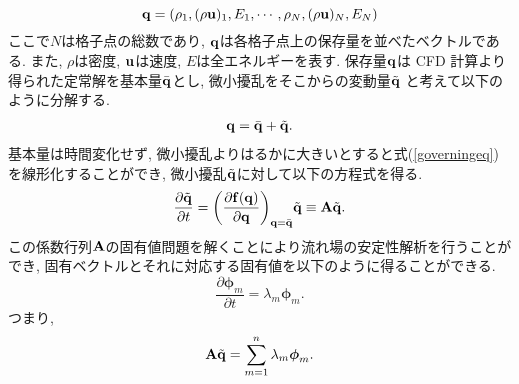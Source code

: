 \begin{equation}
  {\bf q}=(\rho_1, (\rho {\bf u})_1, E_1, \cdots
         ,\rho_N, (\rho {\bf u})_N, E_N) 
\end{equation}
ここで$N$は格子点の総数であり,
$\bf{q}$は各格子点上の保存量を並べたベクトルである.
また, 
$\rho$は密度, 
${\bf u}$は速度, 
$E$は全エネルギーを表す.
保存量$\bf{q}$は CFD 計算より得られた定常解を基本量$\bar{\bf{q}}$とし,
微小擾乱をそこからの変動量$\tilde{\bf{q}}$
と考えて以下のように分解する.
\begin{eqnarray}
  {\bf q} = \bar{\bf q}+\tilde{\bf q}.
\label{decomposition}
\end{eqnarray}
基本量は時間変化せず,
微小擾乱よりはるかに大きいとすると式(\ref{governingeq})を線形化することができ,
微小擾乱$\tilde{\bf{q}}$に対して以下の方程式を得る.
\begin{equation}
  \frac{\partial \tilde{\bf{q}}}{\partial t}
  =\biggl(\frac{\partial {\bf f}({\bf q})}{\partial{\bf q}}\biggr)_{{\bf q} =\bar{\bf q}} \tilde{\bf q}
  \equiv {\bf A} \tilde{\bf q}.
\label{matA}
\end{equation}
この係数行列${\bf A}$の固有値問題を解くことにより流れ場の安定性解析を行うことができ,
固有ベクトルとそれに対応する固有値を以下のように得ることができる.
\begin{equation}
  \frac{\partial {\boldsymbol \phi}_m}{\partial t}=\lambda_m {\boldsymbol \phi}_m.
\end{equation}
つまり,
\begin{equation}
  {\bf A}\tilde{\bf q} = \sum_{m=1}^{n}\lambda_m {\boldsymbol \phi}_m.
\end{equation}
